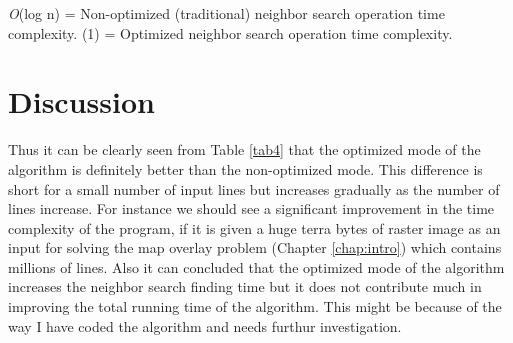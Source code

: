 \noindent
{\it O}(log n) = Non-optimized (traditional) neighbor search operation time complexity.
\newline {}(1) = Optimized neighbor search operation time complexity.

\section{Discussion}
Thus it can be clearly seen from Table \ref{tab4} that the optimized mode of the algorithm is definitely better than the non-optimized mode. This difference is short for a small number of input lines but increases gradually as the number of lines increase. For instance we should see a significant improvement in the time complexity of the program, if it is given a huge terra bytes of raster image as an input for solving the map overlay problem (Chapter \ref{chap:intro}) which contains millions of lines. Also it can concluded that the optimized mode of the algorithm increases the neighbor search finding time but it does not contribute much in improving the total running time of the algorithm. This might be because of the way I have coded the algorithm and needs furthur investigation.
